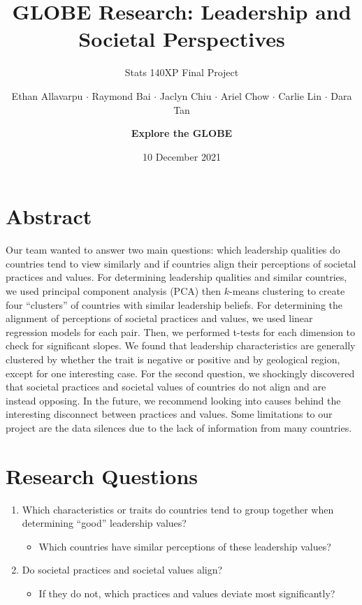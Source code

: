 \documentclass[
]{article}
\title{GLOBE Research: Leadership and Societal Perspectives}
\subtitle{Stats 140XP Final Project}
\author{Ethan Allavarpu \(\cdot\) Raymond Bai \(\cdot\) Jaclyn Chiu
\(\cdot\) Ariel Chow \(\cdot\) Carlie Lin \(\cdot\) Dara
Tan \and \textbf{Explore the GLOBE}}
\date{10 December 2021}
\providecommand{\tightlist}{%
  \setlength{\itemsep}{0pt}\setlength{\parskip}{0pt}}
\begin{document}
\maketitle

{
\setcounter{tocdepth}{1}
\tableofcontents
}
\newpage

\hypertarget{abstract}{%
\section{Abstract}\label{abstract}}

Our team wanted to answer two main questions: which leadership qualities
do countries tend to view similarly and if countries align their
perceptions of societal practices and values. For determining leadership
qualities and similar countries, we used principal component analysis
(PCA) then \(k\)-means clustering to create four ``clusters'' of
countries with similar leadership beliefs. For determining the alignment
of perceptions of societal practices and values, we used linear
regression models for each pair. Then, we performed t-tests for each
dimension to check for significant slopes. We found that leadership
characteristics are generally clustered by whether the trait is negative
or positive and by geological region, except for one interesting case.
For the second question, we shockingly discovered that societal
practices and societal values of countries do not align and are instead
opposing. In the future, we recommend looking into causes behind the
interesting disconnect between practices and values. Some limitations to
our project are the data silences due to the lack of information from
many countries.

\hypertarget{research-questions}{%
\section{Research Questions}\label{research-questions}}

\begin{enumerate}
\def\labelenumi{\arabic{enumi}.}
\tightlist
\item
  Which characteristics or traits do countries tend to group together
  when determining ``good'' leadership values?

  \begin{itemize}
  \tightlist
  \item
    Which countries have similar perceptions of these leadership values?
  \end{itemize}
\item
  Do societal practices and societal values align?

  \begin{itemize}
  \tightlist
  \item
    If they do not, which practices and values deviate most
    significantly?
  \end{itemize}
\end{enumerate}
\end{document}
